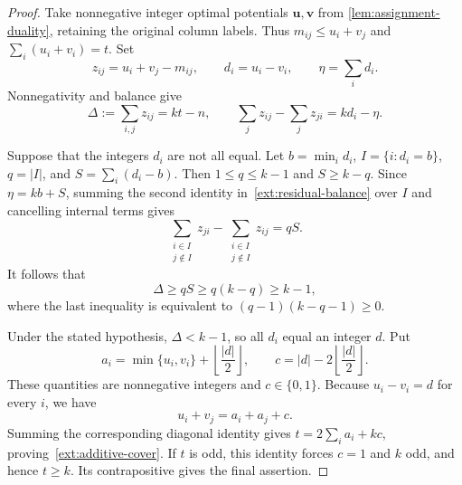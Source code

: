 \documentclass[10pt,a4paper]{amsart}
\numberwithin{equation}{section}
\theoremstyle{definition}
\theoremstyle{remark}
\begin{document}
\begin{proof}
Take nonnegative integer optimal potentials $\mathbf u,\mathbf v$
from \cref{lem:assignment-duality}, retaining the original column
labels. Thus $m_{ij}\le u_i+v_j$ and $\sum_i(u_i+v_i)=t$.
Set
\[
 z_{ij}=u_i+v_j-m_{ij},\qquad
 d_i=u_i-v_i,\qquad \eta=\sum_i d_i.
\]
Nonnegativity and balance give
\begin{equation}
\label{ext:residual-balance}
 \Delta:=\sum_{i,j}z_{ij}=kt-n,
 \qquad
 \sum_jz_{ij}-\sum_jz_{ji}=kd_i-\eta.
\end{equation}

Suppose that the integers $d_i$ are not all equal. Let
$b=\min_i d_i$, $I=\{i:d_i=b\}$, $q=|I|$, and
$S=\sum_i(d_i-b)$. Then $1\le q\le k-1$ and $S\ge k-q$.
Since $\eta=kb+S$, summing the second identity
in~\eqref{ext:residual-balance} over $I$ and cancelling internal
terms gives
\[
 \sum_{\substack{i\in I\\j\notin I}}z_{ji}
 -\sum_{\substack{i\in I\\j\notin I}}z_{ij}=qS.
\]
It follows that
\[
 \Delta\ge qS\ge q(k-q)\ge k-1,
\]
where the last inequality is equivalent to
$(q-1)(k-q-1)\ge0$.

Under the stated hypothesis, $\Delta<k-1$, so all $d_i$ equal an
integer $d$. Put
\[
 a_i=\min\{u_i,v_i\}+\left\lfloor\frac{|d|}{2}\right\rfloor,
 \qquad c=|d|-2\left\lfloor\frac{|d|}{2}\right\rfloor.
\]
These quantities are nonnegative integers and $c\in\{0,1\}$.
Because $u_i-v_i=d$ for every $i$, we have
\[
 u_i+v_j=a_i+a_j+c.
\]
Summing the corresponding diagonal identity gives
$t=2\sum_i a_i+kc$, proving~\eqref{ext:additive-cover}.
If $t$ is odd, this identity forces $c=1$ and $k$ odd, and hence
$t\ge k$. Its contrapositive gives the final assertion.
\end{proof}
\end{document}

